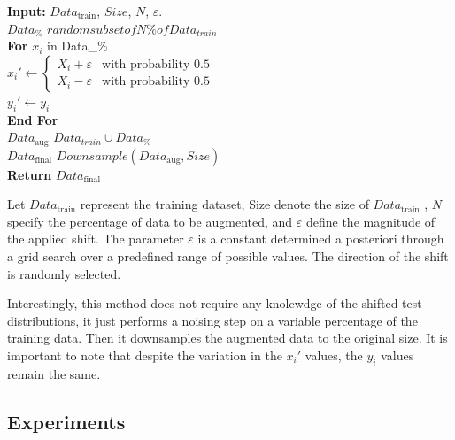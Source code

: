 \begin{algorithm}[H]
    
        \begin{algorithmic}[1]
            \STATE \textbf{Input:} $Data_{\text{train}}$, $Size$, $N$, $\varepsilon$.\\[0.5em]
         
            \State $Data_{\%}$ \leftarrow $random subset of N\% of Data_{train}$\\[0.5em]
                \textbf{For} $x_i$ in Data_{\%}\\[0.5em]
                    \State \phantom{mm} $x_i' \leftarrow 
                    \begin{cases}
                        X_i + \varepsilon & \text{with probability } 0.5 \\
                        X_i - \varepsilon & \text{with probability } 0.5
                    \end{cases}$\\[0.5em]
                    \State \phantom{mm} $y_i' \leftarrow y_i$\\[0.5em]
                \textbf{End For}\\
                \State $Data_\text{aug}$ \leftarrow $Data_{train} \cup Data_{\%}$\\
                \State $Data_\text{final}$ \leftarrow $Downsample(Data_\text{aug}, Size)$\\
            \STATE \textbf{Return} $Data_{\text{final}}$
        \end{algorithmic}
        \caption{Let $Data_{\text{train}}$ represent the training dataset, $\text{Size}$ denote the size of $Data_{\text{train}}$ , $N$ specify the percentage of data to be augmented, and $\varepsilon$ define the magnitude of the applied shift. The parameter $\varepsilon$ is a constant determined a posteriori through a grid search over a predefined range of possible values. The direction of the shift is randomly selected.}
\end{algorithm}



Interestingly, this method does not require any knolewdge of the shifted test distributions, it just performs a noising step on a variable percentage of the training data. Then it downsamples the augmented data to the original size.
It is important to note that despite the variation in the $x_i'$ values, the $y_i$ values remain the same.

\subsection{Experiments}
